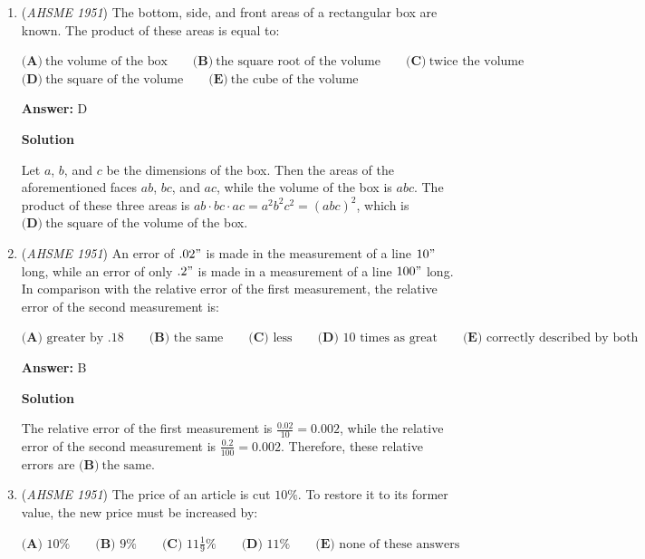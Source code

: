 \begin{enumerate}
	\item (\textit{AHSME 1951}) The bottom, side, and front areas of a rectangular box are known. The product of these areas is equal to:


 $\textbf{(A)}\ \text{the volume of the box} \qquad\textbf{(B)}\ \text{the square root of the volume} \qquad\textbf{(C)}\ \text{twice the volume}$
$\textbf{(D)}\ \text{the square of the volume} \qquad\textbf{(E)}\ \text{the cube of the volume}$

 \textbf{Answer: }D



\textbf{Solution}

Let $a$, $b$, and $c$ be the dimensions of the box. Then the areas of the aforementioned faces $ab$, $bc$, and $ac$, while the volume of the box is $abc$. The product of these three areas is $ab \cdot bc \cdot ac = a^2b^2c^2 = (abc)^2$, which is $\boxed{\textbf{(D)}\ \text{the square of the volume}}$ of the box.

 


	\item (\textit{AHSME 1951}) An error of $.02"$ is made in the measurement of a line $10"$ long, while an error of only $.2"$ is made in a measurement of a line $100"$ long. In comparison with the relative error of the first measurement, the relative error of the second measurement is:


 $\textbf{(A) \ } \text{greater by }.18 \qquad\textbf{(B) \ } \text{the same} \qquad \textbf{(C) \ } \text{less} \qquad\textbf{(D) \ } 10\text{ times as great} \qquad\textbf{(E) \ } \text{correctly described by both}$

 \textbf{Answer: }B



\textbf{Solution}

The relative error of the first measurement is $\frac{0.02}{10} = 0.002$, while the relative error of the second measurement is $\frac{0.2}{100} = 0.002$. Therefore, these relative errors are $\boxed{\textbf{(B)}\ \text{the same}}$.

 


	\item (\textit{AHSME 1951}) The price of an article is cut $10 \%.$ To restore it to its former value, the new price must be increased by:


 $\textbf{(A) \ } 10 \% \qquad\textbf{(B) \ } 9 \% \qquad \textbf{(C) \ } 11\frac{1}{9} \% \qquad\textbf{(D) \ } 11 \% \qquad\textbf{(E) \ } \text{none of these answers}$


\end{enumerate}
